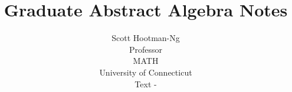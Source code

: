 \documentclass[12pt]{article}
\begin{document}
\date{}

 
\title{Graduate Abstract Algebra Notes}
\author{Scott Hootman-Ng\\Professor \\
MATH \\University of Connecticut\\ Text - } 
 
\maketitle
\section{}
\end{document}
